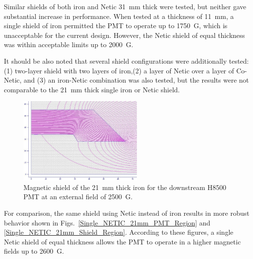 \documentclass[12pt]{article}
\begin{document}
Similar shields of both iron and
Netic 31~mm thick  were tested, but neither gave substantial increase in 
performance. When tested at a thickness of 11~mm, a single shield of iron
permitted the PMT to operate up to 1750~G, which is unacceptable for the current design.
However, the Netic shield of equal thickness was within acceptable limits up to 2000~G.

It should be also  noted that several shield configurations were additionally tested:
(1) two-layer shield with two layers of iron,(2) a layer of Netic over a layer of Co-Netic, and 
(3) an iron-Netic combination was also tested, but the results were not 
comparable to the 21~mm thick single iron or Netic shield.

%
\begin{figure}[htbp]
\centering
\includegraphics[width=0.55\textwidth]{Iron_21mm_Shield.eps}
\caption{\small{Magnetic shield  of the 21~mm thick iron  for the downstream
H8500 PMT at an external field of 2500~G.}}
\label{Single_Iron_21mm_Shield}
\end{figure}
%
For comparison, the same shield using Netic instead of iron results in more robust
behavior shown in Figs.~\ref{Single_NETIC_21mm_PMT_Region}
and \ref{Single_NETIC_21mm_Shield_Region}.
According to these figures, a single Netic shield of equal thickness 
allows the PMT to operate in a higher magnetic fields up to  2600~G. 
\end{document}
